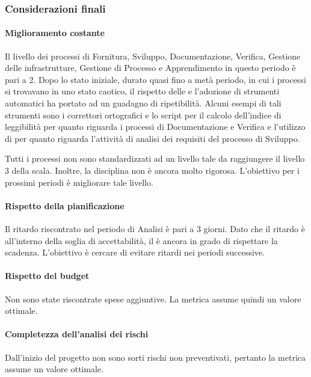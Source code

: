 		\subsubsection{Considerazioni finali}
			\paragraph{Miglioramento costante}
			\label{RMC}
				Il livello  dei processi di Fornitura, Sviluppo, Documentazione, Verifica, Gestione delle infrastrutture, Gestione di Processo e Apprendimento in questo periodo è pari a 2. Dopo lo stato iniziale, durato quasi fino a metà periodo, in cui i processi si trovavano in uno stato caotico, il rispetto delle \ndpvuno{} e l'adozione di strumenti automatici ha portato ad un guadagno di ripetibilità. Alcuni esempi di tali strumenti sono i correttori ortografici e lo script per il calcolo dell'indice di leggibilità per quanto riguarda i processi di Documentazione e Verifica e l'utilizzo di  per quanto riguarda l'attività di analisi dei requisiti del processo di Sviluppo.
				
				
				Tutti i processi non sono standardizzati ad un livello tale da raggiungere il livello 3 della scala. Inoltre, la disciplina non è ancora molto rigorosa. L'obiettivo per i prossimi periodi è migliorare tale livello.
				
			\paragraph{Rispetto della pianificazione}
			\label{RRDP}
				Il ritardo riscontrato nel periodo di Analisi è pari a 3 giorni. Dato che il ritardo è all'interno della soglia di accettabilità, il  è ancora in grado di rispettare la scadenza. L'obiettivo è cercare di evitare ritardi nei periodi successive.
			
			\paragraph{Rispetto del budget}
			\label{RRDB}
				Non sono state riscontrate spese aggiuntive. La metrica assume quindi un valore ottimale.
			
			\paragraph{Completezza dell'analisi dei rischi}
			\label{RCDADR}
				Dall'inizio del progetto non sono sorti rischi non preventivati, pertanto la metrica assume un valore ottimale.
			
